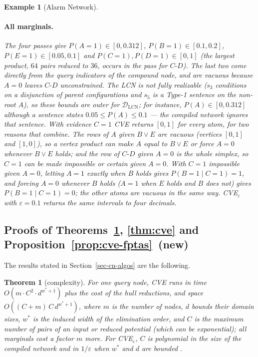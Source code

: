 \documentclass{article} %
\DeclareRobustCommand{\rev}[1]{{\color{blue}#1}}
\newenvironment{revblock}{\color{blue}}{}
\newcommand{\newtag}{\texorpdfstring{~\rev{(new)}}{}}
\newtheorem{theorem}{Theorem}
\newtheorem{example}{Example}
\newcommand{\DLCN}{\mathcal{D}_{\mathrm{LCN}}}
\begin{document}
\begin{example}[Alarm Network]
\paragraph{All marginals.} The four passes give $P(A{=}1)\in[0,0.312]$,
$P(B{=}1)\in[0.1,0.2]$, $P(E{=}1)\in[0.05,0.1]$ and $P(C{=}1),P(D{=}1)\in[0,1]$
(the largest product, $64$ pairs reduced to $36$, occurs in the pass for $C\text{-}D$).
The last two come directly from the query indicators of the compound node, and
are vacuous because $A{=}0$ leaves $C\text{-}D$ unconstrained. The LCN is not
fully realizable ($s_3$ conditions on a disjunction of parent configurations and
$s_5$ is a Type-1 sentence on the non-root $A$), so these bounds are outer for $\DLCN$; for
instance, $P(A)\in[0,0.312]$ although a sentence states $0.05\le P(A)\le0.1$ --- the
compiled network ignores that sentence. With evidence $C{=}1$ CVE returns $[0,1]$ for every
atom, for two reasons that combine. The rows of $A$ given $B\vee E$ are vacuous (vertices
$[0,1]$ and $[1,0]$), so a vertex product can make $A$ equal to $B\vee E$ or force $A{=}0$
whenever $B\vee E$ holds; and the row of $C\text{-}D$ given $A{=}0$ is the whole simplex, so
$C{=}1$ can be made impossible or certain given $A{=}0$. With $C{=}1$ impossible given
$A{=}0$, letting $A{=}1$ exactly when $B$ holds gives $P(B{=}1\mid C{=}1)=1$, and forcing
$A{=}0$ whenever $B$ holds ($A{=}1$ when $E$ holds and $B$ does not) gives
$P(B{=}1\mid C{=}1)=0$; the other atoms are vacuous in the same way.
CVE$_\varepsilon$ with $\varepsilon=0.1$ returns the same intervals to four
decimals.
\end{example}

\subsection{Proofs of Theorems~\ref{thm:cve-cplx}, \ref{thm:cve} and Proposition~\ref{prop:cve-fptas}\newtag}

\begin{revblock}The results stated in Section~\ref{sec-cn-algos} are the following.\end{revblock}

\begin{theorem}[complexity]\label{thm:cve-cplx}
    For one query node, CVE runs in time $O(m \cdot C^2 \cdot d^{w^*+1})$ plus the cost of the hull reductions, and space $O((C+m)\,C\,d^{w^*+1})$, where $m$ is the number of nodes, $d$ bounds their domain sizes, $w^*$ is the induced width of the elimination order, and $C$ is the maximum number of pairs of an input or reduced potential (which can be exponential); all marginals cost a factor $m$ more. For CVE$_\varepsilon$, $C$ is polynomial in the size of the compiled network and in $1/\varepsilon$ when $w^*$ and $d$ are bounded \citep{maua2012ijar}.
\end{theorem}
\end{document}
